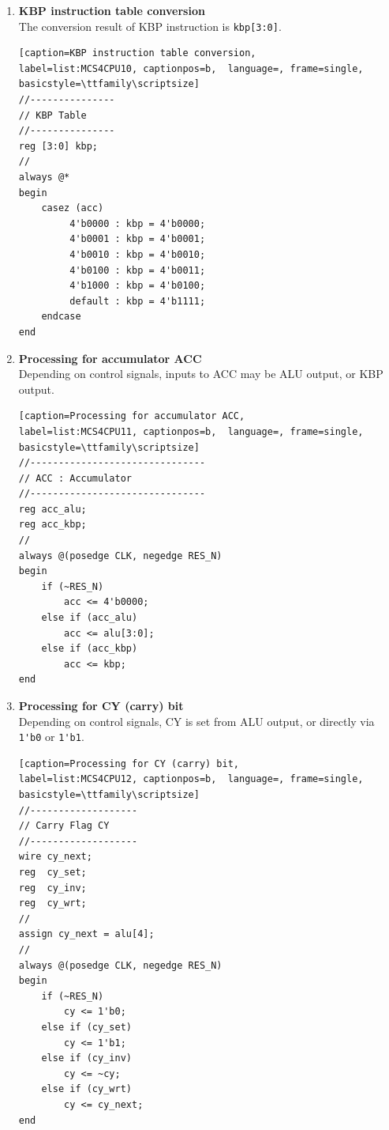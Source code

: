 \begin{enumerate}[(1)]
\item \textbf{KBP instruction table conversion}\\
The conversion result of KBP instruction is  \verb|kbp[3:0]|.
\\
\begin{lstlisting}[caption=KBP instruction table conversion, 
label=list:MCS4CPU10, captionpos=b,  language=, frame=single, basicstyle=\ttfamily\scriptsize]
//---------------
// KBP Table
//---------------
reg [3:0] kbp;
//
always @*
begin
    casez (acc)
         4'b0000 : kbp = 4'b0000;
         4'b0001 : kbp = 4'b0001;
         4'b0010 : kbp = 4'b0010;
         4'b0100 : kbp = 4'b0011;
         4'b1000 : kbp = 4'b0100;
         default : kbp = 4'b1111;
    endcase
end
\end{lstlisting}

\item \textbf{Processing for accumulator ACC}\\
Depending on control signals, inputs to ACC may be ALU output, or KBP output.
\\
\begin{lstlisting}[caption=Processing for accumulator ACC, 
label=list:MCS4CPU11, captionpos=b,  language=, frame=single, basicstyle=\ttfamily\scriptsize]
//-------------------------------
// ACC : Accumulator
//-------------------------------
reg acc_alu;
reg acc_kbp;
//
always @(posedge CLK, negedge RES_N)
begin
    if (~RES_N)
        acc <= 4'b0000;
    else if (acc_alu)
        acc <= alu[3:0];
    else if (acc_kbp)
        acc <= kbp;
end
\end{lstlisting}

\item \textbf{Processing for CY (carry) bit}\\
Depending on control signals, CY is set from ALU output, or directly via \verb|1'b0| or \verb|1'b1|.
\\
\begin{lstlisting}[caption=Processing for CY (carry) bit, 
label=list:MCS4CPU12, captionpos=b,  language=, frame=single, basicstyle=\ttfamily\scriptsize]
//-------------------
// Carry Flag CY
//-------------------
wire cy_next;
reg  cy_set;
reg  cy_inv;
reg  cy_wrt;
//
assign cy_next = alu[4];
//
always @(posedge CLK, negedge RES_N)
begin
    if (~RES_N)
        cy <= 1'b0;
    else if (cy_set)
        cy <= 1'b1;
    else if (cy_inv)
        cy <= ~cy;
    else if (cy_wrt)
        cy <= cy_next;
end
\end{lstlisting}


\end{enumerate}
